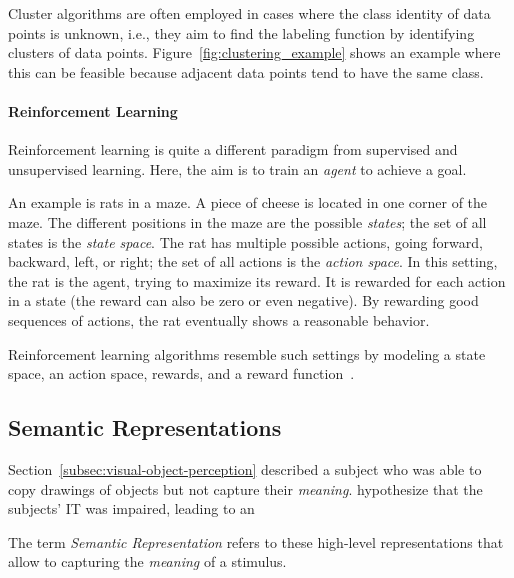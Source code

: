 Cluster algorithms are often employed in cases where the class identity of data points is unknown, i.e., they aim to find the labeling function by identifying clusters of data points.
Figure~\ref{fig:clustering_example} shows an example where this can be feasible because adjacent data points tend to have the same class.

\paragraph{Reinforcement Learning}
Reinforcement learning is quite a different paradigm from supervised and unsupervised learning.
Here, the aim is to train an \textit{agent} to achieve a goal.

An example is rats in a maze.
A piece of cheese is located in one corner of the maze.
The different positions in the maze are the possible \textit{states}; the set of all states is the \textit{state space}.
The rat has multiple possible actions, going forward, backward, left, or right; the set of all actions is the \textit{action space}.
In this setting, the rat is the agent, trying to maximize its reward.
It is rewarded for each action in a state (the reward can also be zero or even negative).
By rewarding good sequences of actions, the rat eventually shows a reasonable behavior.

Reinforcement learning algorithms resemble such settings by modeling a state space, an action space, rewards, and a reward function~\citep[pp. 1, ff.]{sutton2018reinforcement}.

\subsection{Semantic Representations}\label{subsec:semantic-representations}

Section~\ref{subsec:visual-object-perception} described a subject who was able to copy drawings of objects but not capture their \textit{meaning}.
\citet[pp. 1069, 1070]{squire2012fundamental} hypothesize that the subjects' \ac{IT} was impaired, leading to an 

The term \textit{Semantic Representation} refers to these high-level representations that allow to capturing the \textit{meaning} of a stimulus.

